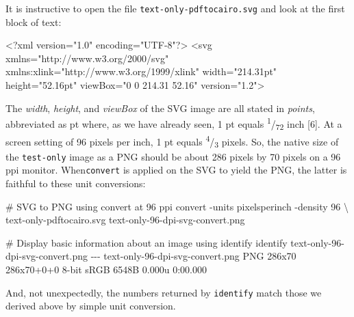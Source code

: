 \documentclass[
  11pt,
  british,
  a4paper,
]{article}
\newenvironment{Shaded}{\begin{snugshade}}{\end{snugshade}}
\newcommand{\AttributeTok}[1]{\textcolor[rgb]{0.80,0.80,0.80}{#1}}
\newcommand{\CommentTok}[1]{\textcolor[rgb]{0.50,0.62,0.50}{#1}}
\newcommand{\DataTypeTok}[1]{\textcolor[rgb]{0.87,0.87,0.75}{#1}}
\newcommand{\ErrorTok}[1]{\textcolor[rgb]{0.76,0.75,0.62}{#1}}
\newcommand{\ExtensionTok}[1]{\textcolor[rgb]{0.80,0.80,0.80}{#1}}
\newcommand{\KeywordTok}[1]{\textcolor[rgb]{0.94,0.87,0.69}{#1}}
\newcommand{\NormalTok}[1]{\textcolor[rgb]{0.80,0.80,0.80}{#1}}
\newcommand{\OtherTok}[1]{\textcolor[rgb]{0.94,0.94,0.56}{#1}}
\newcommand{\StringTok}[1]{\textcolor[rgb]{0.80,0.58,0.58}{#1}}
\begin{document}
It is instructive to open the file \texttt{text-only-pdftocairo.svg} and
look at the first block of text:

\begin{Shaded}
\begin{Highlighting}[]
\KeywordTok{\textless{}?xml}\NormalTok{ version="1.0" encoding="UTF{-}8"}\KeywordTok{?\textgreater{}}
\KeywordTok{\textless{}svg} \ErrorTok{xmlns}\OtherTok{=}\StringTok{"http://www.w3.org/2000/svg"} \ErrorTok{xmlns:xlink}\OtherTok{=}\StringTok{"http://www.w3.org/1999/xlink"} \ErrorTok{width}\OtherTok{=}\StringTok{"214.31pt"} \ErrorTok{height}\OtherTok{=}\StringTok{"52.16pt"} \ErrorTok{viewBox}\OtherTok{=}\StringTok{"0 0 214.31 52.16"} \ErrorTok{version}\OtherTok{=}\StringTok{"1.2"}\KeywordTok{\textgreater{}}
\end{Highlighting}
\end{Shaded}

The \emph{width}, \emph{height}, and \emph{viewBox} of the SVG image are
all stated in \emph{points}, abbreviated as pt where, as we have already
seen, 1 pt equals \textsuperscript{1}/\textsubscript{72} inch {[}6{]}.
At a screen setting of 96 pixels per inch, 1 pt equals
\textsuperscript{4}/\textsubscript{3} pixels. So, the native size of the
\texttt{test-only} image as a PNG should be about 286 pixels by 70
pixels on a 96 ppi monitor. When\texttt{convert} is applied on the SVG
to yield the PNG, the latter is faithful to these unit conversions:

\begin{Shaded}
\begin{Highlighting}[]
\CommentTok{\# SVG to PNG using \textasciigrave{}convert\textasciigrave{} at 96 ppi}
\ExtensionTok{convert} \AttributeTok{{-}units}\NormalTok{ pixelsperinch }\AttributeTok{{-}density}\NormalTok{ 96 }\DataTypeTok{\textbackslash{}}
\NormalTok{text{-}only{-}pdftocairo.svg text{-}only{-}96{-}dpi{-}svg{-}convert.png}

\CommentTok{\# Display basic information about an image using \textasciigrave{}identify\textasciigrave{}}
\ExtensionTok{identify}\NormalTok{ text{-}only{-}96{-}dpi{-}svg{-}convert.png}
\ExtensionTok{{-}{-}{-}}
\ExtensionTok{text{-}only{-}96{-}dpi{-}svg{-}convert.png}\NormalTok{ PNG 286x70 286x70+0+0 8{-}bit sRGB 6548B 0.000u 0:00.000}
\end{Highlighting}
\end{Shaded}

And, not unexpectedly, the numbers returned by \texttt{identify} match
those we derived above by simple unit conversion.
\normalfont
\end{document}
